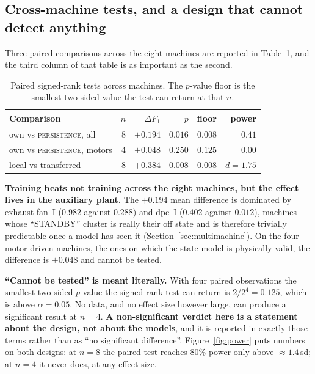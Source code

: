 \subsection{Cross-machine tests, and a design that cannot detect
anything}
\label{sec:significance:cross}

Three paired comparisons across the eight machines are reported in
Table~\ref{tab:sig:cross}, and the third column of that table is as
important as the second.

\begin{table}[t]
\centering
\caption{Paired signed-rank tests across machines. The $p$-value floor
is the smallest two-sided value the test can return at that $n$.}
\label{tab:sig:cross}
\small
\setlength{\tabcolsep}{4pt}
\begin{tabular}{@{}lrrrrr@{}}
\toprule
Comparison & $n$ & $\Delta F_1$ & $p$ & floor & power \\
\midrule
own vs \textsc{persistence}, all      & 8 & $+0.194$ & $0.016$ & $0.008$ & $0.41$ \\
own vs \textsc{persistence}, motors   & 4 & $+0.048$ & $0.250$ & $\mathbf{0.125}$ & $\mathbf{0.00}$ \\
local vs transferred                  & 8 & $+0.384$ & $\mathbf{0.008}$ & $0.008$ & $d=1.75$ \\
\bottomrule
\end{tabular}
\end{table}

\textbf{Training beats not training across the eight machines, but the
effect lives in the auxiliary plant.} The $+0.194$ mean difference is
dominated by exhaust-fan~I ($0.982$ against $0.288$) and dpc~I ($0.402$
against $0.012$), machines whose ``STANDBY'' cluster is really their off
state and is therefore trivially predictable once a model has seen it
(Section~\ref{sec:multimachine}). On the four motor-driven machines, the
ones on which the state model is physically valid, the difference is
$+0.048$ and cannot be tested.

\textbf{``Cannot be tested'' is meant literally.} With four paired
observations the smallest two-sided $p$-value the signed-rank test can
return is $2/2^{4}=0.125$, which is above $\alpha=0.05$. No data, and no
effect size however large, can produce a significant result at $n=4$.
\textbf{A non-significant verdict here is a statement about the design,
not about the models}, and it is reported in exactly those terms rather
than as ``no significant difference''.
Figure~\ref{fig:power} puts numbers on both designs: at $n=8$ the paired
test reaches $80\%$ power only above $\approx1.4$\,sd; at $n=4$ it never
does, at any effect size.


